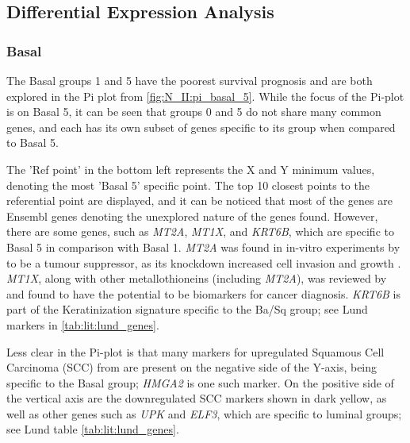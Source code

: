 \subsection{Differential Expression Analysis} \label{s:N_II:dea_rwd}

\subsubsection*{Basal} \label{s:N_II:basal}

The Basal groups 1 and 5 have the poorest survival prognosis and are both explored in the Pi plot from \cref{fig:N_II:pi_basal_5}. While the focus of the Pi-plot is on Basal 5, it can be seen that groups 0 and 5 do not share many common genes, and each has its own subset of genes specific to its group when compared to Basal 5.

The 'Ref point' in the bottom left represents the X and Y minimum values, denoting the most 'Basal 5' specific point. The top 10 closest points to the referential point are displayed, and it can be noticed that most of the genes are Ensembl genes denoting the unexplored nature of the genes found. However, there are some genes, such as \textit{MT2A}, \textit{MT1X}, and \textit{KRT6B}, which are specific to Basal 5 in comparison with Basal 1. \textit{MT2A} was found in in-vitro experiments by to be a tumour suppressor, as its knockdown increased cell invasion and growth \citep{Sung2022-tm}. \textit{MT1X}, along with other metallothioneins (including \textit{MT2A}), was reviewed by \citep{Si2018-ep} and found to have the potential to be biomarkers for cancer diagnosis. \textit{KRT6B} is part of the Keratinization signature specific to the Ba/Sq group; see Lund markers in \cref{tab:lit:lund_genes}.

Less clear in the Pi-plot is that many markers for upregulated Squamous Cell Carcinoma (SCC) from \citep{Hurst2022-sp} are present on the negative side of the Y-axis, being specific to the Basal group; \textit{HMGA2} is one such marker. On the positive side of the vertical axis are the downregulated SCC markers shown in dark yellow, as well as other genes such as \textit{UPK} and \textit{ELF3}, which are specific to luminal groups; see Lund table \cref{tab:lit:lund_genes}.

